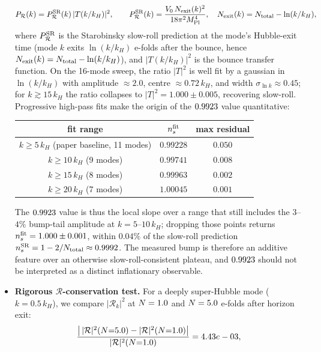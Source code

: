 \documentclass[11pt,a4paper]{article}
\begin{document}
\begin{itemize}
\begin{equation}
P_\mathcal{R}(k) = P_\mathcal{R}^{\rm SR}(k)\,|T(k/k_H)|^2, \qquad P_\mathcal{R}^{\rm SR}(k) = \frac{V_0\,N_{\rm exit}(k)^2}{18\pi^2 M_{\rm Pl}^4},\quad N_{\rm exit}(k) = N_{\rm total} - \ln(k/k_H),
\label{eq:bump_decomp}
\end{equation}
where $P_\mathcal{R}^{\rm SR}$ is the Starobinsky slow-roll prediction at the mode's Hubble-exit time (mode $k$ exits $\ln(k/k_H)$ e-folds after the bounce, hence $N_{\rm exit}(k) = N_{\rm total} - \ln(k/k_H)$), and $|T(k/k_H)|^2$ is the bounce transfer function. On the 16-mode sweep, the ratio $|T|^2$ is well fit by a gaussian in $\ln(k/k_H)$ with amplitude $\approx 2.0$, centre $\approx 0.72\,k_H$, and width $\sigma_{\ln k} \approx 0.45$; for $k \gtrsim 15\,k_H$ the ratio collapses to $|T|^2 = 1.000 \pm 0.005$, recovering slow-roll. Progressive high-pass fits make the origin of the $\nsNumerical$ value quantitative:
\begin{center}
\begin{tabular}{c|c|c}
\hline
fit range & $n_s^{\rm fit}$ & max residual \\
\hline
$k \geq 5\,k_H$ (paper baseline, 11 modes) & $0.99228$ & $0.050$ \\
$k \geq 10\,k_H$ (9 modes) & $0.99741$ & $0.008$ \\
$k \geq 15\,k_H$ (8 modes) & $0.99963$ & $0.002$ \\
$k \geq 20\,k_H$ (7 modes) & $1.00045$ & $0.001$ \\
\hline
\end{tabular}
\end{center}
The $\nsNumerical$ value is thus the local slope over a range that still includes the $3$--$4\%$ bump-tail amplitude at $k = 5$--$10\,k_H$; dropping those points returns $n_s^{\rm fit} = 1.000 \pm 0.001$, within $0.04\%$ of the slow-roll prediction $n_s^{\rm SR} = 1 - 2/N_{\rm total} \approx 0.9992$. The measured bump is therefore an additive feature over an otherwise slow-roll-consistent plateau, and $\nsNumerical$ should not be interpreted as a distinct inflationary observable.
\item \textbf{Rigorous $\mathcal{R}$-conservation test.} For a deeply super-Hubble mode ($k = 0.5\,k_H$), we compare $|\mathcal{R}_k|^2$ at $N = 1.0$ and $N = 5.0$ e-folds after horizon exit:
\begin{equation}
\label{eq:R_conservation}
\frac{\bigl|\,|\mathcal{R}|^2(N{=}\RConservationNlate) - |\mathcal{R}|^2(N{=}\RConservationNearly)\bigr|}{|\mathcal{R}|^2(N{=}\RConservationNearly)} = \RConservationDelta,

\end{equation}
\end{itemize}
\end{document}
